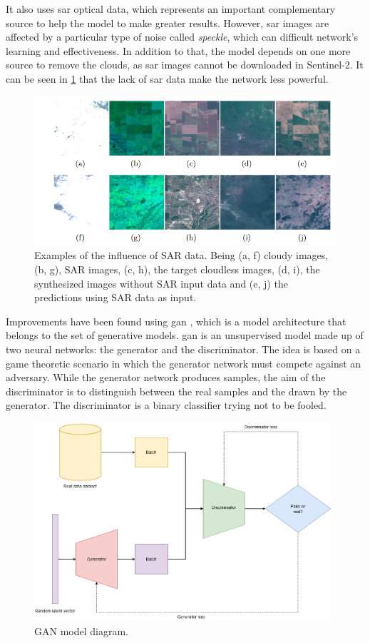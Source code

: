 \documentclass[11pt, a4paper]{article}
\begin{document}
	 It also uses
	\gls{sar} 
	optical data, which represents an important complementary source to help the model to make greater results. However, \gls{sar} images are affected by a particular type of noise called \textit{speckle}, which can difficult network's learning and effectiveness. In addition to that, the model depends on one more source to remove the clouds, as \gls{sar} images cannot be downloaded in Sentinel-2. It can be seen in \ref{fig:related-dsen2-cr-predictions} that the lack of \gls{sar} data make the network less powerful. 
	\begin{figure}[H]
		\centering
		\includegraphics[width=13cm]{imgs/relatedwork/dsen2-cr-predictions.png}
		\caption{Examples of the influence of SAR data. Being (a, f) cloudy images, (b, g), SAR images, (c, h), the target cloudless images, (d, i), the synthesized images without SAR input data and (e, j) the predictions using SAR data as input.}
		\label{fig:related-dsen2-cr-predictions}
	\end{figure}
	Improvements have been found using \gls{gan} \cite{goodfellow2014generative}, which is a model architecture that belongs to the set of generative models. \gls{gan} is an unsupervised model made up of two neural networks: the generator and the discriminator. The idea is based on a game theoretic scenario in which the generator network must compete against an adversary. While the generator network produces samples, the aim of the discriminator is to distinguish between the real samples and the drawn by the generator. The discriminator is a binary classifier trying not to be fooled. 
	\begin{figure}[H]
		\centering
		\includegraphics[width=11cm]{imgs/relatedwork/gan.png}
		\caption{GAN model diagram.}
		\label{fig:related-gan-diagram}
	\end{figure}
\end{document}
